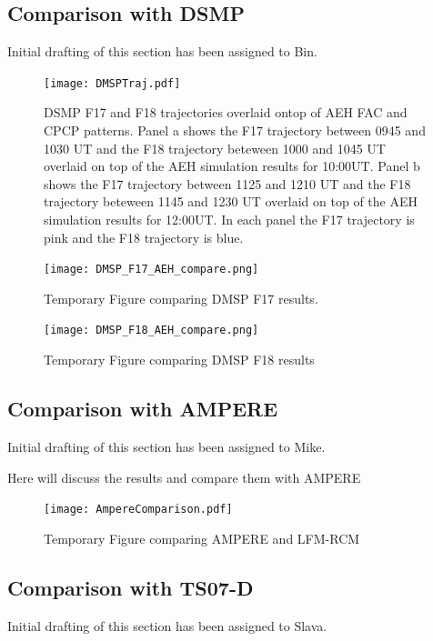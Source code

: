 \documentclass[draft,jgrga]{agutex}
\begin{document}
\begin{article}
 \subsection{Comparison with DSMP}
Initial drafting of this section has been assigned to Bin.
 
 \begin{figure}[t]
\noindent\texttt{[image: DMSPTraj.pdf]}
\caption{\label{dmsptraj-fig}
DSMP F17 and F18 trajectories overlaid ontop of AEH FAC and CPCP patterns.  Panel a shows the F17 trajectory between 0945 and 1030 UT and the F18 trajectory beteween 1000 and 1045 UT overlaid on top of the AEH simulation results for 10:00UT.   Panel b shows the F17 trajectory between 1125 and 1210 UT and the F18 trajectory beteween 1145 and 1230 UT overlaid on top of the AEH simulation results for 12:00UT.  In each panel the F17 trajectory is pink and the F18 trajectory is blue.}
\end{figure}

\begin{figure}[t]
\noindent\texttt{[image: DMSP\_F17\_AEH\_compare.png]}
\caption{\label{f17-comp-fig}
Temporary Figure comparing DMSP F17 results. }
\end{figure}

\begin{figure}[t]
\noindent\texttt{[image: DMSP\_F18\_AEH\_compare.png]}
\caption{\label{f18-comp-fig}
Temporary Figure comparing DMSP F18 results}
\end{figure}

 \subsection{Comparison with AMPERE}
 
 Initial drafting of this section has been assigned to Mike.
 
 Here will discuss the results and compare them with AMPERE
 
\begin{figure}[t]
\noindent\texttt{[image: AmpereComparison.pdf]}
\caption{\label{ampere-comp-fig}
Temporary Figure comparing AMPERE and LFM-RCM}
\end{figure}

 \subsection{Comparison with TS07-D}
 
 Initial drafting of this section has been assigned to Slava.
 

\end{article}
\end{document}
